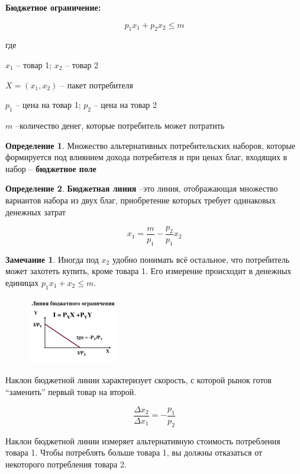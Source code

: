 \documentclass[reqno]{article}
\theoremstyle{definition}
\newtheorem*{nb}{Замечание}
\theoremstyle{definition}
\theoremstyle{definition}
\theoremstyle{definition}
\theoremstyle{definition}
\theoremstyle{definition}
\theoremstyle{definition}
\newtheorem*{defi}{Определение}
\theoremstyle{definition}
\theoremstyle{definition}
\begin{document}
		\textbf{Бюджетное ограничение:}
		
		$$p_1 x_1 + p_2 x_2 \leq m$$
		
		где
		
		$x_1$ -- товар 1; $x_2$ -- товар 2
		
		$X = (x_1,x_2)$ -- пакет потребителя
		
		$p_1$ -- цена на товар 1; $p_2$ -- цена на товар 2
		
		$m$ --количество денег, которые потребитель может потратить
	
		\begin{defi}
			Множество альтернативных потребительских наборов, которые формируется под влиянием дохода потребителя и при ценах благ, входящих в набор -- \textbf{бюджетное поле}
		\end{defi}
			
		\begin{defi}
			\textbf{Бюджетная линия} –это линия, отображающая множество вариантов набора из двух благ, приобретение которых требует одинаковых денежных затрат
		\end{defi}
		$$x_1 = \dfrac{m}{p_1} - \dfrac{p_2}{p_1} x_2$$
			
		\begin{nb}
			Иногда под $x_2$ удобно понимать всё остальное, что потребитель может захотеть купить, кроме товара 1. Его измерение происходит в денежных единицах $p_1 x_1 + x_2 \leq m$.
		\end{nb}
			 
		\begin{figure}[h!]
			\centering
			\includegraphics[width=0.35\textwidth]{Линия_бюджетного_ограничения}
		\end{figure}
		
		Наклон бюджетной линии характеризует скорость, с которой рынок готов ``заменить'' первый товар на второй.
			
		$$\dfrac{\Delta x_2}{\Delta x_1} = - \dfrac{p_1}{p_2}$$
			
		Наклон бюджетной линии измеряет альтернативную стоимость потребления товара 1. Чтобы потреблять больше товара 1, вы должны отказаться от некоторого потребления товара 2.
			
\end{document}
